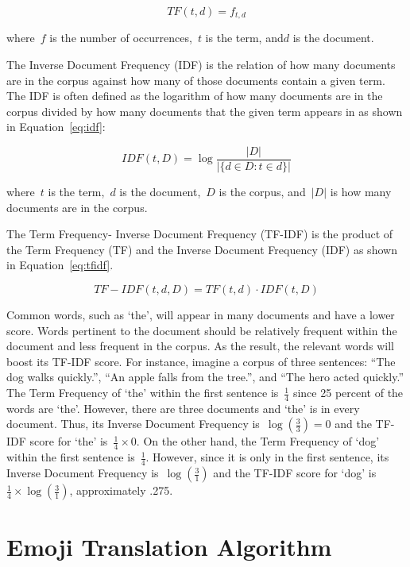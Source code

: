 \documentclass{article}[10]
\begin{document}
\begin{equation}
  TF(t, d) = f_{t, d} \label{eq:tf}
\end{equation}

where~\(f\) is the number of occurrences,~\(t\) is the term, and\(d\) is
the document.

The Inverse Document Frequency (IDF) is the relation of how many
documents are in the corpus against how many of those documents contain
a given term. The IDF is often defined as the logarithm of how many
documents are in the corpus divided by how many documents that the given
term appears in as shown in Equation~\eqref{eq:idf}:

\begin{equation}
  IDF(t, D) = \log\frac{|D|}{|\{d \in D : t \in d\}|} \label{eq:idf}
\end{equation}

where~\(t\) is the term,~\(d\) is the
document,~\(D\) is the corpus, and~\(\left|D\right|\) is
how many documents are in the corpus.

The Term Frequency- Inverse Document Frequency (TF-IDF) is the product
of the Term Frequency (TF) and the Inverse Document Frequency (IDF) as
shown in Equation~\eqref{eq:tfidf}.

\begin{equation}
  TF-IDF(t, d, D) = TF(t, d) \cdot IDF(t, D) \label{eq:tfidf}
\end{equation}

Common words, such as `the', will appear in many documents and have a
lower score. Words pertinent to the document should be relatively
frequent within the document and less frequent in the corpus. As the
result, the relevant words will boost its TF-IDF score. For instance,
imagine a corpus of three sentences: ``The dog walks quickly.'', ``An
apple falls from the tree.'', and ``The hero acted quickly.'' The Term
Frequency of `the' within the first sentence is~\(\frac{1}{4}\)
since 25 percent of the words are `the'. However, there are three
documents and `the' is in every document. Thus, its Inverse Document
Frequency is~\(\log(\frac{3}{3}) = 0\) and the TF-IDF score for `the'
is~\(\frac{1}{4} \times 0\). On the other hand, the Term Frequency of `dog'
within the first sentence is~\(\frac{1}{4}\). However, since it is
only in the first sentence, its Inverse Document Frequency
is~\(\log(\frac{3}{1})\) and the TF-IDF score for `dog'
is~\(\frac{1}{4} \times \log(\frac{3}{1})\), approximately .275.

\section{Emoji Translation Algorithm\label{sec:EmojiTranslationAlgorithm}}
\end{document}
